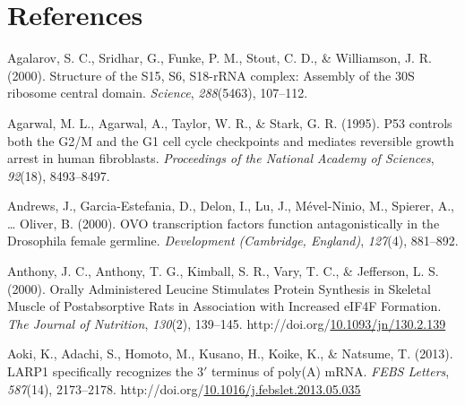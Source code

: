 \documentclass[12pt,oneside]{reedthesis}
\newlength{\cslhangindent}
\newenvironment{CSLReferences}[2] %
 {%
  \setlength{\parindent}{0pt}
  \ifodd #1 \everypar{\setlength{\hangindent}{\cslhangindent}}\ignorespaces\fi
  \ifnum #2 > 0
  \setlength{\parskip}{#2\baselineskip}
  \fi
 }%
 {}
\begin{document}
\backmatter

\hypertarget{references}{%
\chapter*{References}\label{references}}


\noindent

\setlength{\parindent}{-0.20in}
\setlength{\leftskip}{0.20in}
\setlength{\parskip}{8pt}

\hypertarget{refs}{}
\begin{CSLReferences}{1}{0}
\leavevmode{}%
Agalarov, S. C., Sridhar, G., Funke, P. M., Stout, C. D., \& Williamson, J. R. (2000). Structure of the {S15}, {S6}, {S18}-{rRNA} complex: Assembly of the {30S} ribosome central domain. \emph{Science}, \emph{288}(5463), 107--112.

\leavevmode{}%
Agarwal, M. L., Agarwal, A., Taylor, W. R., \& Stark, G. R. (1995). P53 controls both the {G2}/{M} and the {G1} cell cycle checkpoints and mediates reversible growth arrest in human fibroblasts. \emph{Proceedings of the National Academy of Sciences}, \emph{92}(18), 8493--8497.

\leavevmode{}%
Andrews, J., Garcia-Estefania, D., Delon, I., Lu, J., Mével-Ninio, M., Spierer, A., \ldots{} Oliver, B. (2000). {OVO} transcription factors function antagonistically in the {Drosophila} female germline. \emph{Development (Cambridge, England)}, \emph{127}(4), 881--892.

\leavevmode{}%
Anthony, J. C., Anthony, T. G., Kimball, S. R., Vary, T. C., \& Jefferson, L. S. (2000). Orally {Administered Leucine Stimulates Protein Synthesis} in {Skeletal Muscle} of {Postabsorptive Rats} in {Association} with {Increased eIF4F Formation}. \emph{The Journal of Nutrition}, \emph{130}(2), 139--145. http://doi.org/\href{https://doi.org/10.1093/jn/130.2.139}{10.1093/jn/130.2.139}

\leavevmode{}%
Aoki, K., Adachi, S., Homoto, M., Kusano, H., Koike, K., \& Natsume, T. (2013). {LARP1} specifically recognizes the 3{\({'}\)} terminus of poly({A}) {mRNA}. \emph{FEBS Letters}, \emph{587}(14), 2173--2178. http://doi.org/\href{https://doi.org/10.1016/j.febslet.2013.05.035}{10.1016/j.febslet.2013.05.035}


\end{CSLReferences}
\end{document}

